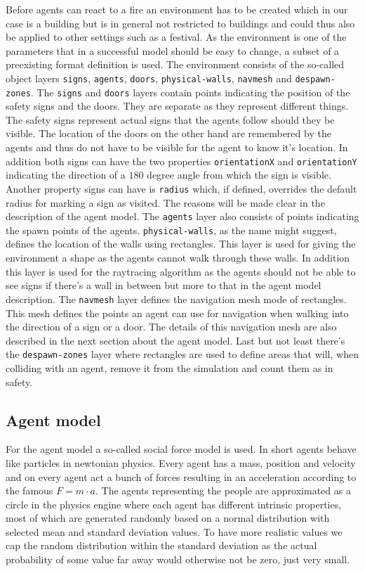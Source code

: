 \documentclass[11pt]{article}
\begin{document}
Before agents can react to a fire an environment has to be created which in our case is a building but is in general not restricted to buildings and could thus also be applied to other settings such as a festival. As the environment is one of the parameters that in a successful model should be easy to change, a subset of a preexisting format definition is used. The environment consists of the so-called object layers \texttt{signs}, \texttt{agents}, \texttt{doors}, \texttt{physical-walls}, \texttt{navmesh} and \texttt{despawn-zones}. The \texttt{signs} and \texttt{doors} layers contain points indicating the position of the safety signs and the doors. They are separate as they represent different things. The safety signs represent actual signs that the agents follow should they be visible. The location of the doors on the other hand are remembered by the agents and thus do not have to be visible for the agent to know it's location. In addition both signs can have the two properties \texttt{orientationX} and \texttt{orientationY} indicating the direction of a $180$ degree angle from which the sign is visible. Another property signs can have is \texttt{radius} which, if defined, overrides the default radius for marking a sign as visited. The reasons will be made clear in the description of the agent model. The \texttt{agents} layer also consists of points indicating the spawn points of the agents. \texttt{physical-walls}, as the name might suggest, defines the location of the walls using rectangles. This layer is used for giving the environment a shape as the agents cannot walk through these walls. In addition this layer is used for the raytracing algorithm as the agents should not be able to see signs if there's a wall in between but more to that in the agent model description. The \texttt{navmesh} layer defines the navigation mesh mode of rectangles. This mesh defines the points an agent can use for navigation when walking into the direction of a sign or a door. The details of this navigation mesh are also described in the next section about the agent model. Last but not least there's the \texttt{despawn-zones} layer where rectangles are used to define areas that will, when colliding with an agent, remove it from the simulation and count them as in safety.

\subsection{Agent model}
For the agent model a so-called social force model is used. In short agents behave like particles in newtonian physics. Every agent has a mass, position and velocity and on every agent act a bunch of forces resulting in an acceleration according to the famous $F=m\cdot a$. The agents representing the people are approximated as a circle in the physics engine where each agent has different intrinsic properties, most of which are generated randomly based on a normal distribution with selected mean and standard deviation values. To have more realistic values we cap the random distribution within the standard deviation as the actual probability of some value far away would otherwise not be zero, just very small.
\end{document}
